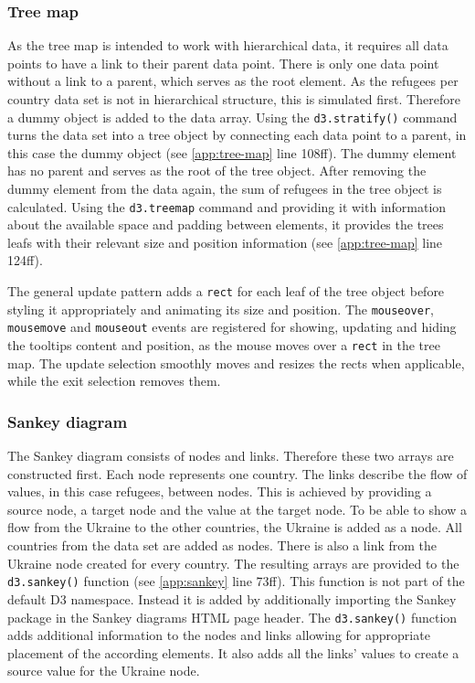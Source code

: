 \subsubsection{Tree map}
As the tree map is intended to work with hierarchical data, it requires all data points to have a link to their parent data point. There is only one data point without a link to a parent, which serves as the root element. As the refugees per country data set is not in hierarchical structure, this is simulated first. Therefore a dummy object is added to the data array. Using the \texttt{d3.stratify()} command turns the data set into a tree object by connecting each data point to a parent, in this case the dummy object (see \ref{app:tree-map} line 108ff). The dummy element has no parent and serves as the root of the tree object. After removing the dummy element from the data again, the sum of refugees in the tree object is calculated. Using the \texttt{d3.treemap} command and providing it with information about the available space and padding between elements, it provides the trees leafs with their relevant size and position information (see \ref{app:tree-map} line 124ff).

The general update pattern adds a \texttt{rect} for each leaf of the tree object before styling it appropriately and animating its size and position. The \texttt{mouseover}, \texttt{mousemove} and \texttt{mouseout} events are registered for showing, updating and hiding the tooltips content and position, as the mouse moves over a \texttt{rect} in the tree map. The update selection smoothly moves and resizes the rects when applicable, while the exit selection removes them.


\subsubsection{Sankey diagram}
The Sankey diagram consists of nodes and links. Therefore these two arrays are constructed first. Each node represents one country. The links describe the flow of values, in this case refugees, between nodes. This is achieved by providing a source node, a target node and the value at the target node. To be able to show a flow from the Ukraine to the other countries, the Ukraine is added as a node. All countries from the data set are added as nodes. There is also a link from the Ukraine node created for every country. The resulting arrays are provided to the \texttt{d3.sankey()} function (see \ref{app:sankey} line 73ff). This function is not part of the default D3 namespace. Instead it is added by additionally importing the Sankey package in the Sankey diagrams HTML page header. The \texttt{d3.sankey()} function adds additional information to the nodes and links allowing for appropriate placement of the according elements. It also adds all the links' values to create a source value for the Ukraine node.

